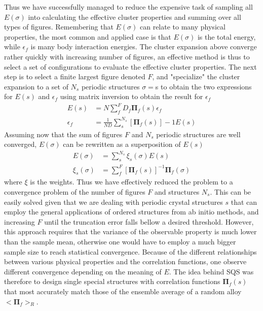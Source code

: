 Thus we have successfully managed to reduce the expensive task of sampling all $E(\sigma)$ into calculating the effective cluster properties and summing over all types of figures. Remembering that $E(\sigma)$ can relate to many physical properties, the most common and applied case is that $E(\sigma)$ is the total energy, while $\epsilon_f$ is many body interaction energies. The cluster expansion above converge rather quickly with increasing number of figures, an effective method is thus to select a set of configurations to evaluate the effective cluster properties. The next step is to select a finite largest figure denoted $F$, and "specialize" the cluster expansion to a set of $N_s$ periodic structures ${\sigma} = ${s} to obtain the two expressions for $E(s)$ and $\epsilon_f$ using matrix inversion to obtain the result for $\epsilon_f$
\begin{align}
E(s) &= N\sum_{f}^{F} D_f \boldsymbol{\Pi}_f (s)\epsilon_f \\     
\epsilon_f &= \frac{1}{ND}\sum_{s}^{N_s}[\boldsymbol{\Pi}_f (s)]-1E(s)
\end{align}
Assuming now that the sum of figures $F$ and $N_s$ periodic structures are well converged, $E(\sigma)$ can be rewritten as a superposition of $E(s)$
\begin{align}
    E(\sigma) &= \sum_{s}^{N_s}\xi_s(\sigma)E(s) \\
    \xi_s(\sigma) &= \sum_{f}^{F}[\boldsymbol{\Pi}_f(s)]^{-1}\boldsymbol{\Pi}_f(\sigma)    
\end{align}
where $\xi$ is the weights. Thus we have effectively reduced the problem to a convergence problem of the number of figures $F$ and structures $N_s$. This can be easily solved given that we are dealing with periodic crystal structures ${s}$ that can employ the general applications of ordered structures from ab initio methods, and increasing $F$ until the truncation error falls bellow a desired threshold. However, this approach requires that the variance of the observable property is much lower than the sample mean, otherwise one would have to employ a much bigger sample size to reach statistical convergence. Because of the different relationships between various physical properties and the correlation functions, one observe different convergence depending on the meaning of $E$. The idea behind SQS was therefore to design single special structures with correlation functions ${\boldsymbol{\Pi}_f(s)}$ that most accurately match those of the ensemble average of a random alloy $<\boldsymbol{\Pi}_f>_R$. 

